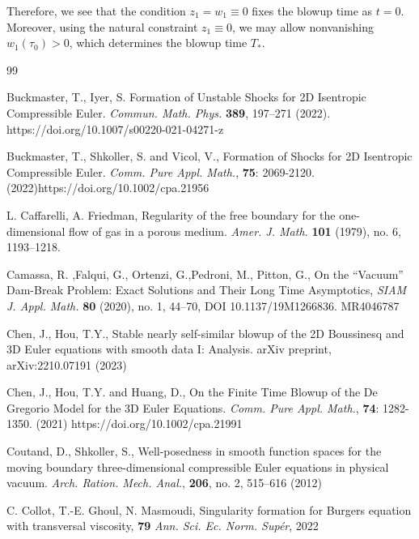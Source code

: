 \documentclass{article}
\numberwithin{equation}{section}
\begin{document}
Therefore, we see that the condition $z_1=w_1\equiv 0$ fixes the blowup time as $t=0$. Moreover, using the natural constraint $z_1\equiv 0$, we may allow nonvanishing $w_1(\tau_0)>0$, which determines the blowup time $T_*$.    



\begin{thebibliography}{99}







Buckmaster, T., Iyer, S. Formation of Unstable Shocks for 2D Isentropic Compressible Euler. \emph{Commun. Math. Phys.} \textbf{389}, 197–271 (2022). https://doi.org/10.1007/s00220-021-04271-z

{Buckmaster, T., Shkoller, S. and Vicol, V.}, Formation of Shocks for 2D Isentropic Compressible Euler. \emph{Comm. Pure Appl. Math.}, \textbf{75}: 2069-2120.  (2022)https://doi.org/10.1002/cpa.21956







L. Caffarelli, A. Friedman, Regularity of the free boundary for the one-dimensional flow of gas in a porous medium. \emph{Amer. J. Math.} \textbf{101} (1979), no. 6, 1193--1218.


Camassa, R. ,Falqui, G., Ortenzi, G.,Pedroni, M., Pitton, G., On the “Vacuum” Dam-Break Problem: Exact Solutions and Their Long Time Asymptotics, {\em SIAM J. Appl. Math.} {\bf 80} (2020), no. 1, 44–70, DOI 10.1137/19M1266836. MR4046787


Chen, J., Hou, T.Y.,
Stable nearly self-similar blowup of the 2D Boussinesq and 3D Euler equations with smooth data I: Analysis. arXiv preprint, arXiv:2210.07191 (2023)

Chen, J., Hou, T.Y. and Huang, D., On the Finite Time Blowup of the De Gregorio Model for the 3D Euler Equations. \emph{Comm. Pure Appl. Math.}, \textbf{74}: 1282-1350. (2021) https://doi.org/10.1002/cpa.21991


Coutand, D., Shkoller, S.,
Well-posedness in smooth function spaces for the moving boundary three-dimensional compressible Euler equations in physical vacuum.
{\em Arch. Ration. Mech. Anal.},
{\bf 206}, no. 2, 515--616 (2012)



{C. Collot, T.-E. Ghoul, N. Masmoudi,} Singularity formation for Burgers equation with transversal viscosity, {\bf 79}  {\em Ann. Sci. Ec. Norm. Sup\'{e}r},  2022


\end{thebibliography}
\end{document}
